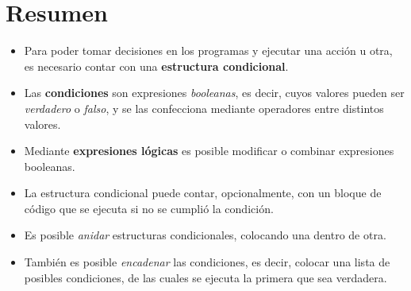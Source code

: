 \section{Resumen}
\begin{itemize}
\item Para poder tomar decisiones en los programas y ejecutar una acción u
otra, es necesario contar con una \textbf{estructura condicional}.
\item Las \textbf{condiciones} son expresiones \textit{booleanas}, es
decir, cuyos valores pueden ser \textit{verdadero} o \textit{falso}, y se
las confecciona mediante operadores entre distintos valores.
\item Mediante \textbf{expresiones lógicas} es posible modificar o combinar
expresiones booleanas.
\item La estructura condicional puede contar, opcionalmente, con un bloque
de código que se ejecuta si no se cumplió la condición.
\item Es posible \textit{anidar} estructuras condicionales, colocando una
dentro de otra.
\item También es posible \textit{encadenar} las condiciones, es decir,
colocar una lista de posibles condiciones, de las cuales se ejecuta la
primera que sea verdadera.
\end{itemize}

